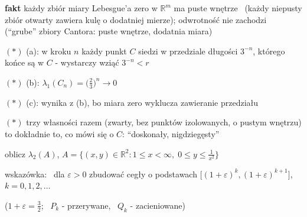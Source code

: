 \documentclass[a4paper,12pt]{article}
\begin{document}
\smallskip
\textbf{fakt} \; każdy zbiór miary Lebesgue'a zero w \(\mathbb{R}^m\) ma puste wnętrze \, (każdy niepusty zbiór otwarty zawiera kulę o dodatniej mierze); \; odwrotność nie zachodzi \, (\enquote{grube} zbiory Cantora: puste wnętrze, dodatnia miara)

\bigskip
\((*)\) \; (a): w kroku \(n\) każdy punkt \(C\) siedzi w przedziale długości \(3^{-n}\), którego końce są w \(C\) - wystarczy wziąć \(3^{-n} < r\)

\smallskip
\((*)\) \; (b): \(\lambda_1(C_n) = \big(\frac{2}{3}\big)^n \to 0\)

\smallskip
\((*)\) \; (c): wynika z (b), bo miara zero wyklucza zawieranie przedziału

\smallskip
\((*)\) \; trzy własności razem (zwarty, bez punktów izolowanych, o pustym wnętrzu) to dokładnie to, co mówi się o \(C\): \enquote{doskonały, nigdziegęsty}

\bigskip
{} \; oblicz \(\lambda_2(A)\), \; \(A = \{(x, y) \in \mathbb{R}^2 : 1 \leq x < \infty, \; 0 \leq y \leq \frac{1}{x^2}\}\)

\smallskip
wskazówka: \, dla \(\varepsilon > 0\) zbudować cegły o podstawach \(\big[(1 + \varepsilon)^k, (1 + \varepsilon)^{k+1}\big]\), \; \(k = 0, 1, 2, \dots\)

\begin{center}

{\small (\(1 + \varepsilon = \frac{3}{2}\); \, \(P_k\) - przerywane, \, \(Q_k\) - zacieniowane)}
\end{center}
\end{document}
